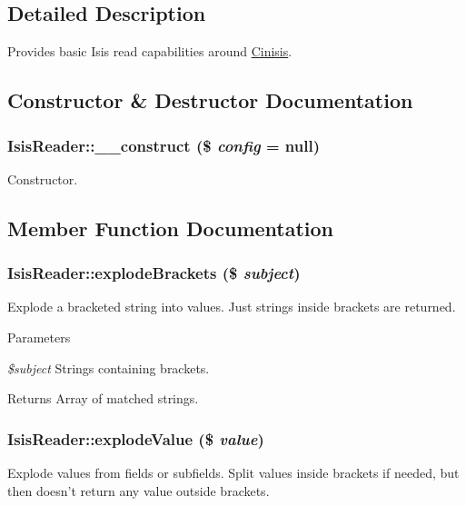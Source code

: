 \subsection{Detailed Description}
Provides basic Isis read capabilities around \hyperlink{classCinisis}{Cinisis}. 

\subsection{Constructor \& Destructor Documentation}
\hypertarget{classIsisReader_a70d1444cf56269795b4947dd82b2a4ac}{
\subsubsection[{\_\-\_\-construct}]{\setlength{\rightskip}{0pt plus 5cm}IsisReader::\_\-\_\-construct (\$ {\em config} = {\ttfamily null})}}
\label{classIsisReader_a70d1444cf56269795b4947dd82b2a4ac}
Constructor. 

\subsection{Member Function Documentation}
\hypertarget{classIsisReader_a4610ebcf69c197e2c596965e2dc0358e}{
\subsubsection[{explodeBrackets}]{\setlength{\rightskip}{0pt plus 5cm}IsisReader::explodeBrackets (\$ {\em subject})}}
\label{classIsisReader_a4610ebcf69c197e2c596965e2dc0358e}
Explode a bracketed string into values. Just strings inside brackets are returned.


\begin{DoxyParams}{Parameters}
\item[{\em \$subject}]Strings containing brackets.\end{DoxyParams}
\begin{DoxyReturn}{Returns}
Array of matched strings. 
\end{DoxyReturn}
\hypertarget{classIsisReader_a3cc08df25da082046d496db93778709b}{
\subsubsection[{explodeValue}]{\setlength{\rightskip}{0pt plus 5cm}IsisReader::explodeValue (\$ {\em value})}}
\label{classIsisReader_a3cc08df25da082046d496db93778709b}
Explode values from fields or subfields. Split values inside brackets if needed, but then doesn't return any value outside brackets.


